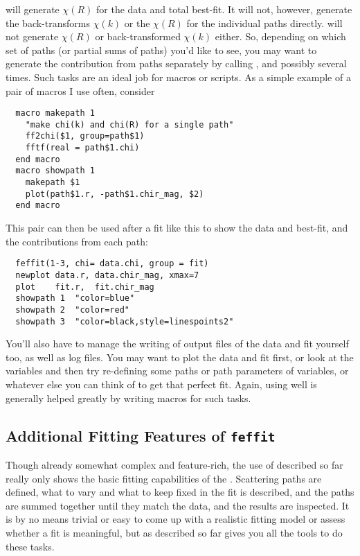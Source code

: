 {} will generate $\chi(R)$ for the data and total best-fit.
It will not, however, generate the back-transforms $\chi(k)$ or the
$\chi(R)$ for the individual paths directly.  {} will not
generate $\chi(R)$ or back-transformed $\chi(k)$ either.  So, depending on
which set of paths (or partial sums of paths) you'd like to see, you may
want to generate the contribution from paths separately by calling
{}, and possibly {} several times.  Such tasks are
an ideal job for macros or scripts.  As a simple example of a pair of macros
I use often, consider
\begin{verbatim}
  macro makepath 1
    "make chi(k) and chi(R) for a single path"
    ff2chi($1, group=path$1)
    fftf(real = path$1.chi)
  end macro
  macro showpath 1
    makepath $1
    plot(path$1.r, -path$1.chir_mag, $2)
  end macro
\end{verbatim} 
\noindent %
This pair can then be used after a fit like this to show the data and
best-fit, and the contributions from each path:
\begin{verbatim}
  feffit(1-3, chi= data.chi, group = fit)
  newplot data.r, data.chir_mag, xmax=7
  plot    fit.r,  fit.chir_mag
  showpath 1  "color=blue"
  showpath 2  "color=red"
  showpath 3  "color=black,style=linespoints2"
\end{verbatim}
\noindent  
You'll also have to manage the writing of output files of the data and fit
yourself too, as well as log files.  You may want to plot the data and fit
first, or look at the variables and then try re-defining some paths or path
parameters of variables, or whatever else you can think of to get that
perfect fit.  Again, using {} well is generally helped greatly
by writing macros for such tasks.


\subsection{Additional Fitting Features of {\texttt{feffit}}}
\label{Ch:FEFFIT-advanced}

Though already somewhat complex and feature-rich, the use of
{} described so far really only shows the basic fitting
capabilities of the {}.  Scattering paths are defined, what to
vary and what to keep fixed in the fit is described, and the paths are
summed together until they match the data, and the results are inspected.
It is by no means trivial or easy to come up with a realistic fitting model
or assess whether a fit is meaningful, but {} as described so
far gives you all the tools to do these tasks.

